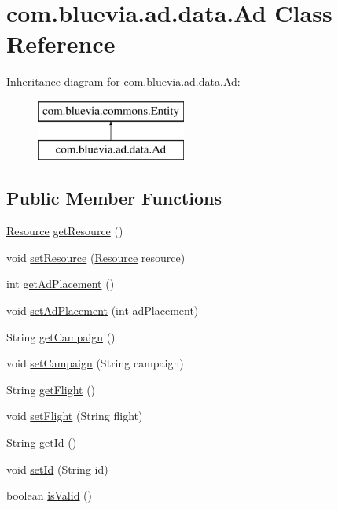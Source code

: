 \hypertarget{classcom_1_1bluevia_1_1ad_1_1data_1_1Ad}{
\section{com.bluevia.ad.data.Ad Class Reference}
\label{classcom_1_1bluevia_1_1ad_1_1data_1_1Ad}
}
Inheritance diagram for com.bluevia.ad.data.Ad:\begin{figure}[H]
\begin{center}
\leavevmode
\includegraphics[height=2.000000cm]{classcom_1_1bluevia_1_1ad_1_1data_1_1Ad}
\end{center}
\end{figure}
\subsection*{Public Member Functions}
\begin{DoxyCompactItemize}
\item 
\hyperlink{classcom_1_1bluevia_1_1ad_1_1data_1_1Resource}{Resource} \hyperlink{classcom_1_1bluevia_1_1ad_1_1data_1_1Ad_af2c9881982bc884e387dab9d75f5f72e}{getResource} ()
\item 
void \hyperlink{classcom_1_1bluevia_1_1ad_1_1data_1_1Ad_ad93de5b76d88e053b8ce89eb0b9b17c5}{setResource} (\hyperlink{classcom_1_1bluevia_1_1ad_1_1data_1_1Resource}{Resource} resource)
\item 
int \hyperlink{classcom_1_1bluevia_1_1ad_1_1data_1_1Ad_a145fce538292452d8e00924002a1d8d9}{getAdPlacement} ()
\item 
void \hyperlink{classcom_1_1bluevia_1_1ad_1_1data_1_1Ad_a2772fa698541f4f8834f7257fe611f49}{setAdPlacement} (int adPlacement)
\item 
String \hyperlink{classcom_1_1bluevia_1_1ad_1_1data_1_1Ad_a85c7ad2e6e978b11e1db603664a467b9}{getCampaign} ()
\item 
void \hyperlink{classcom_1_1bluevia_1_1ad_1_1data_1_1Ad_a511c3b4883a8de41994838d25bff838a}{setCampaign} (String campaign)
\item 
String \hyperlink{classcom_1_1bluevia_1_1ad_1_1data_1_1Ad_a8bd822d5487b8d5ed97e1e42a0f100e6}{getFlight} ()
\item 
void \hyperlink{classcom_1_1bluevia_1_1ad_1_1data_1_1Ad_a63009a0d86583fd9deeb959ba0f307cd}{setFlight} (String flight)
\item 
String \hyperlink{classcom_1_1bluevia_1_1ad_1_1data_1_1Ad_a234310b78e2dbad8099ed9dcc4b69ea2}{getId} ()
\item 
void \hyperlink{classcom_1_1bluevia_1_1ad_1_1data_1_1Ad_a448c1373ae7365b945c82b1b4339790c}{setId} (String id)
\item 
boolean \hyperlink{classcom_1_1bluevia_1_1ad_1_1data_1_1Ad_a30b6952e1715fb192a884e2f5f01f06d}{isValid} ()
\end{DoxyCompactItemize}


